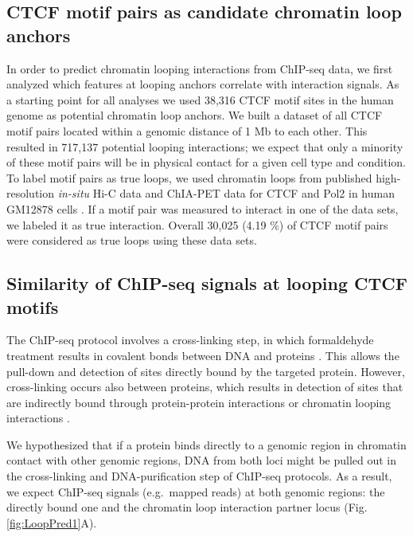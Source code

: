 \documentclass[a4paper,twoside=true,openright,parskip=full,chapterprefix=true,11pt,headings=normal,bibliography=totoc,listof=totoc,titlepage=on,captions=tableabove,draft=false]{scrreprt}
\theoremstyle{definition}
\theoremstyle{definition}
\theoremstyle{definition}
\theoremstyle{remark}
\begin{document}
\hypertarget{ctcf-motif-pairs-as-candidate-chromatin-loop-anchors}{%
\subsection{CTCF motif pairs as candidate chromatin loop
anchors}\label{ctcf-motif-pairs-as-candidate-chromatin-loop-anchors}}

In order to predict chromatin looping interactions from ChIP-seq data,
we first analyzed which features at looping anchors correlate with
interaction signals. As a starting point for all analyses we used 38,316
CTCF motif sites in the human genome as potential chromatin loop
anchors. We built a dataset of all CTCF motif pairs located within a
genomic distance of 1 Mb to each other. This resulted in 717,137
potential looping interactions; we expect that only a minority of these
motif pairs will be in physical contact for a given cell type and
condition. To label motif pairs as true loops, we used chromatin loops
from published high-resolution \emph{in-situ} Hi-C data and ChIA-PET
data for CTCF and Pol2 in human GM12878 cells \citep{Rao2014, Tang2015}.
If a motif pair was measured to interact in one of the data sets, we
labeled it as true interaction. Overall 30,025 (4.19 \%) of CTCF motif
pairs were considered as true loops using these data sets.

\hypertarget{similarity-of-chip-seq-signals-at-looping-ctcf-motifs}{%
\subsection{Similarity of ChIP-seq signals at looping CTCF
motifs}\label{similarity-of-chip-seq-signals-at-looping-ctcf-motifs}}

The ChIP-seq protocol involves a cross-linking step, in which
formaldehyde treatment results in covalent bonds between DNA and
proteins \citep{Orlando1997}. This allows the pull-down and detection of
sites directly bound by the targeted protein. However, cross-linking
occurs also between proteins, which results in detection of sites that
are indirectly bound through protein-protein interactions or chromatin
looping interactions \citep{Hoffman2015, Starick2015}.

We hypothesized that if a protein binds directly to a genomic region in
chromatin contact with other genomic regions, DNA from both loci might
be pulled out in the cross-linking and DNA-purification step of ChIP-seq
protocols. As a result, we expect ChIP-seq signals (e.g.~mapped reads)
at both genomic regions: the directly bound one and the chromatin loop
interaction partner locus (Fig. \ref{fig:LoopPred1}A).
\end{document}
